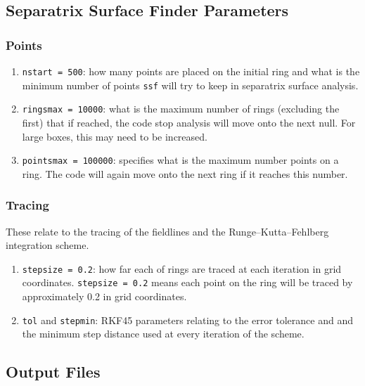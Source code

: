 \documentclass[12pt]{article}
\begin{document}
    \subsection{Separatrix Surface Finder Parameters}

      \subsubsection{Points}
      
      \begin{enumerate}
        \item \texttt{nstart = 500}: how many points are placed on the initial ring and what is the minimum number of points \texttt{ssf} will try to keep in separatrix surface analysis.
        \item \texttt{ringsmax = 10000}: what is the maximum number of rings (excluding the first) that if reached, the code stop analysis will move onto the next null. For large boxes, this may need to be increased.
        \item \texttt{pointsmax = 100000}: specifies what is the maximum number points on a ring. The code will again move onto the next ring if it reaches this number.
      \end{enumerate}

      \subsubsection{Tracing}

      These relate to the tracing of the fieldlines and the Runge–Kutta–Fehlberg integration scheme.

      \begin{enumerate}
        \item \texttt{stepsize = 0.2}: how far each of rings are traced at each iteration in grid coordinates. \texttt{stepsize = 0.2} means each point on the ring will be traced by approximately 0.2 in grid coordinates.
        \item \texttt{tol} and \texttt{stepmin}: RKF45 parameters relating to the error tolerance and and the minimum step distance used at every iteration of the scheme.
      \end{enumerate}
    
    \subsection{Output Files}
  
\end{document}
